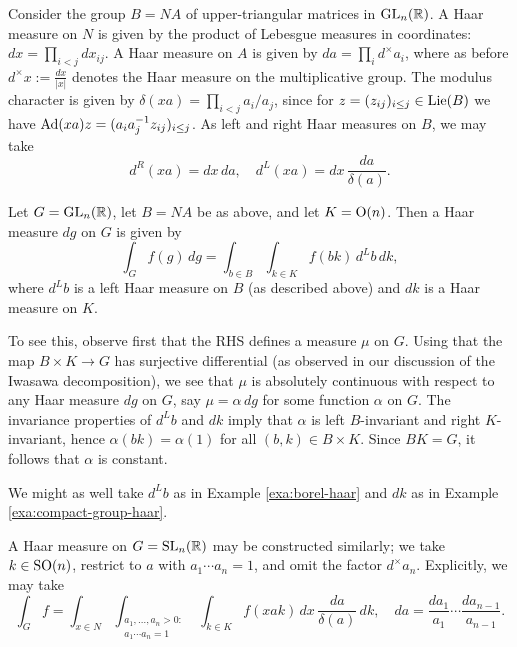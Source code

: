 \documentclass[reqno]{amsart} 
\begin{document}
\begin{example}\label{exa:borel-haar}
  Consider the group $B = N A$ of upper-triangular matrices in $\operatorname{GL}_n(\mathbb{R})$.  A Haar measure on $N$ is given by the product of Lebesgue measures in coordinates: $d x = \prod_{i < j} d x_{i j}$.  A Haar measure on $A$ is given by $d a = \prod_{i} d^\times a_i$, where as before $d^\times x := \frac{d x}{ |x|}$ denotes the Haar measure on the multiplicative group.  The modulus character is given by $\delta(x a) = \prod_{i < j} a_i / a_j$, since for $z = (z_{i j})_{i \leq j} \in \operatorname{Lie}(B)$ we have $\operatorname{Ad}(x a) z = (a_i a_j^{-1} z_{i j})_{i \leq j}$.  As left and right Haar measures on $B$, we may take
  \begin{equation*}
    d^R (x a) = d x \, d a, \quad d^L (x a) = d x \, \frac{d a}{\delta(a)}.
  \end{equation*}
\end{example}

\begin{example}
  Let $G = \operatorname{GL}_n(\mathbb{R})$, let $B = N A$ be as above, and let $K = \operatorname{O}(n)$.  Then a Haar measure $d g$ on $G$ is given by
  \begin{equation*}
    \int_G f(g) \, d g = \int _{b \in B} \int _{k \in K} f(b k) \, d^L b \, d k,
  \end{equation*}
  where $d^L b$ is a left Haar measure on $B$ (as described above) and $d k$ is a Haar measure on $K$.

  To see this, observe first that the RHS defines a measure $\mu$ on $G$.  Using that the map $B \times K \rightarrow G$ has surjective differential (as observed in our discussion of the Iwasawa decomposition), we see that $\mu$ is absolutely continuous with respect to any Haar measure $d g$ on $G$, say $\mu = \alpha \, d g$ for some function $\alpha$ on $G$.  The invariance properties of $d^L b$ and $d k$ imply that $\alpha$ is left $B$-invariant and right $K$-invariant, hence $\alpha(b k) = \alpha(1)$ for all $(b,k) \in B \times K$.  Since $B K = G$, it follows that $\alpha$ is constant.

  We might as well take $d^L b$ as in Example \ref{exa:borel-haar} and $d k$ as in Example \ref{exa:compact-group-haar}.
\end{example}

\begin{example}\label{exa:2}
  A Haar measure on $G = \operatorname{SL}_n(\mathbb{R})$ may be constructed similarly; we take $k \in \operatorname{SO}(n)$, restrict to $a$ with $a_1 \dotsb a_n = 1$, and omit the factor $d^\times a_n$.  Explicitly, we may take
  \begin{equation}\label{eq:int_g-f-=-3}
    \int_G f
    =
    \int _{x \in N}
    \int _{ \substack{
        a_1, \dotsc, a_n > 0 : \\
        a_1 \dotsb a_n = 1 
      }
    }
    \int_{k \in K}
    f(x a k)
    \, d x \, \frac{d a}{\delta(a)} \, d k,
    \quad
    d a = \frac{d a_1}{a_1} \dotsb \frac{d a_{n-1}}{a _{n-1}}.
  \end{equation}
\end{example}
\end{document}
